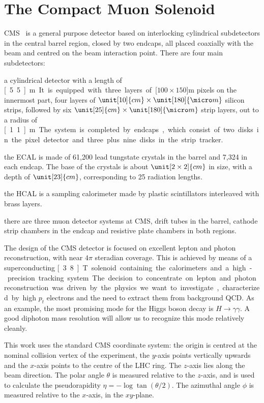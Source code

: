 \section{The Compact Muon Solenoid}
CMS~\cite{intro:cms} is a general purpose detector based on interlocking cylindrical subdetectors in the central \qmo{}barrel\qmc{} region, closed by two endcaps, all placed coaxially with the beam and centred on the beam interaction point.
There are four main subdetectors:
\begin{packed_description}
   \item[silicon tracker: ] a cylindrical detector with a length of \unit[5.5]{m}. It is equipped with three layers of \unit[$100\times150$]{\micro m} pixels on the innermost part, four layers of $\unit[10]{cm} \times \unit[180]{\micro m}$ silicon strips, followed by six $\unit[25]{cm} \times \unit[180]{\micro m}$ strip layers, out to a radius of \unit[1.1]{m}. The system is completed by endcaps, which consist of two disks in the pixel detector and three plus nine disks in the strip tracker.
    \item[electromagnetic calorimeter: ]the ECAL is made of 61,200 lead tungstate crystals in the barrel and 7,324 in each endcap. The base of the crystals is about $\unit[2\times2]{cm}$ in size, with a depth of $\unit[23]{cm}$, corresponding to 25 radiation lengths.
    \item[hadronic calorimeter: ] the HCAL is a sampling calorimeter made by plastic scintillators interleaved with brass layers.
    \item[muon chambers: ]there are three muon detector systems at CMS, drift tubes in the barrel, cathode strip chambers in the endcap and resistive plate chambers in both regions.
\end{packed_description}

The design of the CMS detector is focused on excellent lepton and photon reconstruction, with near $4\pi$ steradian coverage. This is achieved by means of a superconducting \unit[3.8]{T} solenoid containing the calorimeters and a high-precision tracking system. The decision to concentrate on lepton and photon reconstruction was driven by the physics we want to investigate, characterized by high $p_t$ electrons and the need to extract them from background QCD. As an example, the most promising mode for the Higgs boson decay is $H\rightarrow \gamma\gamma$. A good diphoton mass resolution will allow us to recognize this mode relatively cleanly.

This work uses the standard CMS coordinate system: the origin is centred at the nominal collision vertex of the experiment, the $y$-axis points vertically upwards and the $x$-axis points to the centre of the LHC ring. The $z$-axis lies along the beam direction. The polar angle $\theta$ is measured relative to the $z$-axis, and is used to calculate the pseudorapidity $\eta = -\log\tan(\theta/2)$. The azimuthal angle $\phi$ is measured relative to the $x$-axis, in the $xy$-plane.

